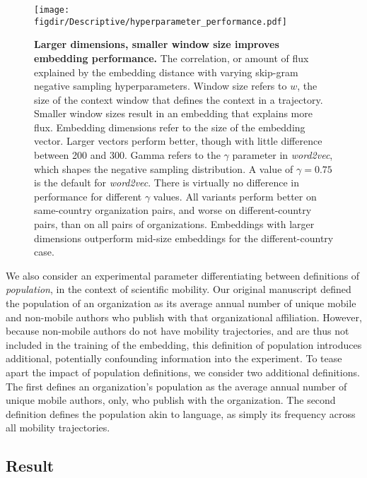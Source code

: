 \documentclass[12pt,a4paper]{article}
\def\figdir{../Figs}
\begin{document}
%
%
\begin{figure}[ht!]
	\centering
	\texttt{[image: \\figdir/Descriptive/hyperparameter\_performance.pdf]}
	\caption{
		\textbf{Larger dimensions, smaller window size improves embedding performance.}
		The correlation, or amount of flux explained by the embedding distance with varying skip-gram negative sampling hyperparameters.
		Window size refers to $w$, the size of the context window that defines the context in a trajectory.
		Smaller window sizes result in an embedding that explains more flux.
		Embedding dimensions refer to the size of the embedding vector.
		Larger vectors perform better, though with little difference between 200 and 300.
		Gamma refers to the $\gamma$ parameter in \textit{word2vec}, which shapes the negative sampling distribution.
		A value of $\gamma = 0.75$ is the default for \textit{word2vec}.
		There is virtually no difference in performance for different $\gamma$ values.
		All variants perform better on same-country organization pairs, and worse on different-country pairs, than on all pairs of organizations.
		Embeddings with larger dimensions outperform mid-size embeddings for the different-country case.
	}

	\label{fig:supp:hyperparameter}
\end{figure}

We also consider an experimental parameter differentiating between definitions of \textit{population}, in the context of scientific mobility.
Our original manuscript defined the population of an organization as its average annual number of unique mobile and non-mobile authors who publish with that organizational affiliation.
However, because non-mobile authors do not have mobility trajectories, and are thus not included in the training of the embedding, this definition of population introduces additional, potentially confounding information into the experiment.
To tease apart the impact of population definitions, we consider two additional definitions.
The first defines an organization's population as the average annual number of unique mobile authors, only, who publish with the organization.
The second definition defines the population akin to language, as simply its frequency across all mobility trajectories.

\subsection{Result}
\end{document}
